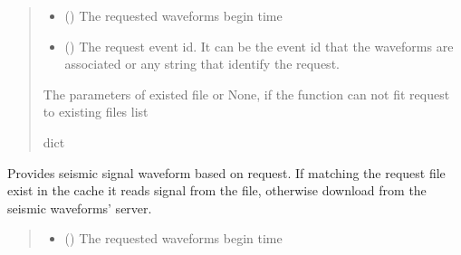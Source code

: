 \documentclass[letterpaper,10pt,english]{sphinxmanual}
\begin{document}
\begin{fulllineitems}
\begin{fulllineitems}
\begin{quote}
\begin{description}
\begin{itemize}
\item {} 
\sphinxAtStartPar
{} () \textendash{} The requested waveforms begin time

\item {} 
\sphinxAtStartPar
{} () \textendash{} The request event id. It can be the event id that the waveforms are associated
or any string that identify the request.

\end{itemize}

\sphinxAtStartPar
The parameters of existed file or None,
if the function can not fit request to existing files list

\sphinxAtStartPar
dict

\end{description}\end{quote}

\end{fulllineitems}


\begin{fulllineitems}
\label{\detokenize{api_core:amw.core.signal_utils.StreamLoader.get_signal}}
\pysigstartsignatures
{}
\pysigstopsignatures
\sphinxAtStartPar
Provides seismic signal waveform based on request.
If matching the request file exist in the cache it reads signal from the file,
otherwise download from the seismic waveforms’ server.
\begin{quote}\begin{description}
\begin{itemize}
\item {} 
\sphinxAtStartPar
{} () \textendash{} The requested waveforms begin time


\end{itemize}
\end{description}
\end{quote}
\end{fulllineitems}
\end{fulllineitems}
\end{document}
